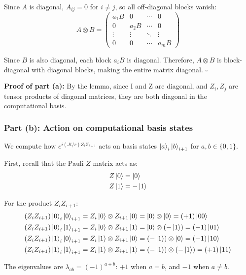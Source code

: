 \documentclass[11pt]{article}
\begin{document}
Since $A$ is diagonal, $A_{ij} = 0$ for $i \neq j$, so all off-diagonal blocks vanish:
\begin{equation}
A \otimes B = \begin{pmatrix}
a_1 B & 0 & \cdots & 0 \\
0 & a_2 B & \cdots & 0 \\
\vdots & \vdots & \ddots & \vdots \\
0 & 0 & \cdots & a_m B
\end{pmatrix}
\end{equation}

Since $B$ is also diagonal, each block $a_i B$ is diagonal. Therefore, $A \otimes B$ is block-diagonal with diagonal blocks, making the entire matrix diagonal. $\square$

\textbf{Proof of part (a):} By the lemma, since I and Z are diagonal, and $Z_i, Z_j$ are tensor products of diagonal matrices, they are both diagonal in the computational basis.

\subsubsection*{Part (b): Action on computational basis states}

We compute how $e^{i(Jt/r) Z_i Z_{i+1}}$ acts on basis states $\ket{a}_i \ket{b}_{i+1}$ for $a, b \in \{0,1\}$.

First, recall that the Pauli $Z$ matrix acts as:
\begin{align}
Z\ket{0} &= \ket{0} \\
Z\ket{1} &= -\ket{1}
\end{align}

For the product $Z_i Z_{i+1}$:
\begin{align}
(Z_i Z_{i+1}) \ket{0}_i \ket{0}_{i+1} &= Z_i\ket{0} \otimes Z_{i+1}\ket{0} = \ket{0} \otimes \ket{0} = (+1) \ket{00} \\
(Z_i Z_{i+1}) \ket{0}_i \ket{1}_{i+1} &= Z_i\ket{0} \otimes Z_{i+1}\ket{1} = \ket{0} \otimes (-\ket{1}) = (-1) \ket{01} \\
(Z_i Z_{i+1}) \ket{1}_i \ket{0}_{i+1} &= Z_i\ket{1} \otimes Z_{i+1}\ket{0} = (-\ket{1}) \otimes \ket{0} = (-1) \ket{10} \\
(Z_i Z_{i+1}) \ket{1}_i \ket{1}_{i+1} &= Z_i\ket{1} \otimes Z_{i+1}\ket{1} = (-\ket{1}) \otimes (-\ket{1}) = (+1) \ket{11}
\end{align}

The eigenvalues are $\lambda_{ab} = (-1)^{a+b}$: $+1$ when $a = b$, and $-1$ when $a \neq b$.
\end{document}
